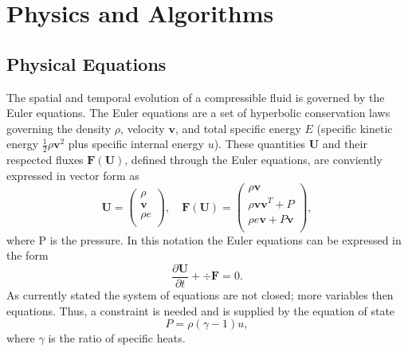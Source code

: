 \section{Physics and Algorithms}
\subsection{Physical Equations}
The spatial and temporal evolution of a compressible fluid is governed by the Euler equations.
The Euler equations are a set of hyperbolic conservation laws governing the density $\rho$,
velocity $\mathbf{v}$, and total specific energy $E$ (specific kinetic energy
$\frac{1}{2}\rho \mathbf{v}^2$ plus specific internal energy $u$). These quantities $\mathbf{U}$
and their respected fluxes $\mathbf{F}(\mathbf{U})$, defined through the Euler equations, are
conviently expressed in vector form as
%
\begin{equation}
    \mathbf{U} =
    \left(
    \begin{array}{c}
        \rho \\
        \mathbf{v} \\
        \rho e \\
    \end{array} \right),
    \quad
    \mathbf{F}(\mathbf{U}) =
    \left(
    \begin{array}{c}
        \rho\mathbf{v} \\
        \rho\mathbf{v}\mathbf{v}^T + P \\
        \rho e\mathbf{v} + P\mathbf{v} \\
    \end{array}
    \right),
\end{equation}
%
where P is the pressure. In this notation the Euler equations can be expressed in the form
%
\begin{equation}
    \label{eq.euler}
    \frac{\partial \mathbf{U}}{\partial t} + \div \mathbf{F} = 0.
\end{equation}
%
As currently stated the system of equations are not closed; more variables then equations. Thus,
a constraint is needed and is supplied by the equation of state
%
\begin{equation}
    P = \rho(\gamma - 1)u,
\end{equation}
%
where $\gamma$ is the ratio of specific heats.

